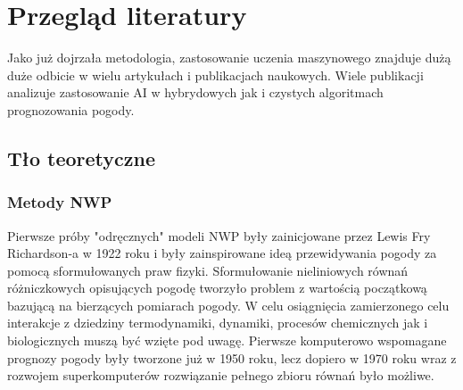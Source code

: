 

\section{Przegląd literatury}

Jako już dojrzała metodologia, zastosowanie uczenia maszynowego 
znajduje dużą duże odbicie w wielu artykułach i publikacjach naukowych. 
Wiele publikacji analizuje zastosowanie AI w hybrydowych jak i czystych 
algoritmach prognozowania pogody. 


\subsection{Tło teoretyczne}


\subsubsection{Metody NWP}

Pierwsze próby "odręcznych" modeli NWP były zainicjowane przez Lewis Fry Richardson-a w 1922 roku i 
były zainspirowane ideą przewidywania pogody za pomocą sformułowanych praw fizyki. Sformułowanie
nieliniowych równań różniczkowych opisujących pogodę tworzyło problem z wartością początkową bazującą
na bierzących pomiarach pogody. W celu osiągnięcia zamierzonego celu interakcje z dziedziny 
termodynamiki, dynamiki, procesów chemicznych jak i biologicznych muszą być wzięte pod uwagę.
Pierwsze komputerowo wspomagane prognozy pogody były tworzone już w 1950 roku, lecz dopiero
w 1970 roku wraz z rozwojem superkomputerów rozwiązanie pełnego zbioru równań było możliwe.

